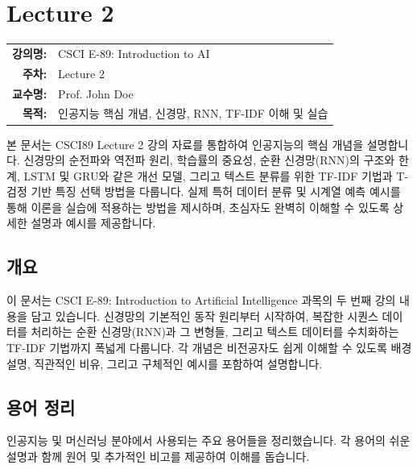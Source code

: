 \documentclass[11pt,a4paper]{book}
\makeatletter
\theoremstyle{definition}
\newcommand{\metainfo}[4]{
\begin{tcolorbox}[
    colback=lightpurple,
    colframe=darkpurple,
    boxrule=1pt,
    arc=2mm,
    left=10pt,
    right=10pt,
    top=8pt,
    bottom=8pt
]
\begin{tabular}{@{}rl@{}}
\textbf{강의명:} & #1 \\[0.3em]
\textbf{주차:} & #2 \\[0.3em]
\textbf{교수명:} & #3 \\[0.3em]
\textbf{목적:} & \begin{minipage}[t]{0.75\textwidth}#4\end{minipage}
\end{tabular}
\end{tcolorbox}
}
\makeatother
\begin{document}
\chapter{Lecture 2}
\label{ch:lecture2}

\metainfo{CSCI E-89: Introduction to AI}{Lecture 2}{Prof. John Doe}{인공지능 핵심 개념, 신경망, RNN, TF-IDF 이해 및 실습}


\begin{summarybox}
본 문서는 CSCI89 Lecture 2 강의 자료를 통합하여 인공지능의 핵심 개념을 설명합니다.
신경망의 순전파와 역전파 원리, 학습률의 중요성, 순환 신경망(RNN)의 구조와 한계,
LSTM 및 GRU와 같은 개선 모델, 그리고 텍스트 분류를 위한 TF-IDF 기법과 T-검정 기반 특징 선택 방법을 다룹니다.
실제 특허 데이터 분류 및 시계열 예측 예시를 통해 이론을 실습에 적용하는 방법을 제시하며,
초심자도 완벽히 이해할 수 있도록 상세한 설명과 예시를 제공합니다.
\end{summarybox}


\section{개요}
이 문서는 CSCI E-89: Introduction to Artificial Intelligence 과목의 두 번째 강의 내용을 담고 있습니다. 신경망의 기본적인 동작 원리부터 시작하여, 복잡한 시퀀스 데이터를 처리하는 순환 신경망(RNN)과 그 변형들, 그리고 텍스트 데이터를 수치화하는 TF-IDF 기법까지 폭넓게 다룹니다. 각 개념은 비전공자도 쉽게 이해할 수 있도록 배경 설명, 직관적인 비유, 그리고 구체적인 예시를 포함하여 설명합니다.


\section{용어 정리}
인공지능 및 머신러닝 분야에서 사용되는 주요 용어들을 정리했습니다. 각 용어의 쉬운 설명과 함께 원어 및 추가적인 비고를 제공하여 이해를 돕습니다.
\end{document}

